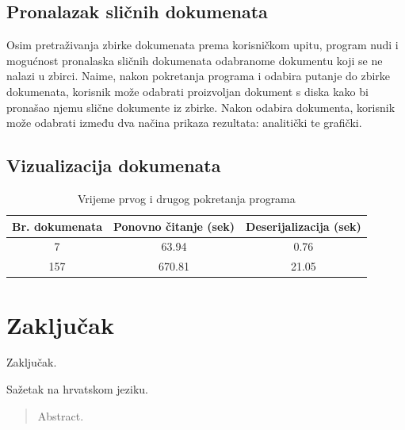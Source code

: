\documentclass[times, utf8, zavrsni]{fer}
\begin{document}
\section{Pronalazak sličnih dokumenata}
Osim pretraživanja zbirke dokumenata prema korisničkom upitu, program nudi i mogućnost pronalaska sličnih dokumenata odabranome dokumentu koji se ne nalazi u zbirci. Naime, nakon pokretanja programa i odabira putanje do zbirke dokumenata, korisnik može odabrati proizvoljan dokument s diska kako bi pronašao njemu slične dokumente iz zbirke. Nakon odabira dokumenta, korisnik može odabrati između dva načina prikaza rezultata: analitički te grafički.

\section{Vizualizacija dokumenata}

\begin{table}
\begin{center}
\begin{tabular}{|c|c|c|}
\hline
Br. dokumenata & Ponovno čitanje (sek) & Deserijalizacija (sek) \\
\hline
7 & 63.94 & 0.76 \\
157 & 670.81 & 21.05 \\
\hline
\end{tabular}
\end{center}
\caption{Vrijeme prvog i drugog pokretanja programa}
\label{table:serialization}
\end{table}

\chapter{Zaključak}
Zaključak.




\begin{sazetak}
Sažetak na hrvatskom jeziku.

\end{sazetak}

\begin{abstract}
Abstract.

\end{abstract}
\end{document}
